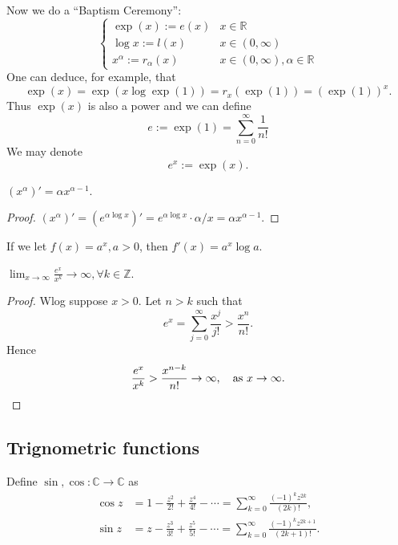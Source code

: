 Now we do a ``Baptism Ceremony'':
\[
    \begin{cases}
    \exp (x):=e(x) &x\in \mathbb{R} \\
    \log x :=l(x) &x\in (0,\infty )\\
    x^{\alpha}:= r_\alpha(x) & x\in (0,\infty ),\alpha\in \mathbb{R}
    \end{cases} 
\]
One can deduce, for example, that 
\[
    \exp (x)=\exp (x \log \exp (1) ) = r_x(\exp (1)) = (\exp (1))^x.
\]
Thus $\exp(x)$ is also a power and we can define 
\[
    \boxed{e:= \exp (1) = \sum_{n=0}^{\infty}\frac{1}{n!}}
\]
We may denote 
\[
    e^x:= \exp (x).
\]
\begin{sprop}
    $ (x^\alpha)'=\alpha x^{\alpha-1} $.
\end{sprop}
\begin{proof}
    $ (x^\alpha)'=(e^{\alpha \log x})'=e^{\alpha \log x}\cdot \alpha/x = \alpha x^{\alpha-1} $.
\end{proof}
\begin{note}
    If we let $ f(x)=a^x,a>0 $, then $ f'(x)=a^x\log a $.
\end{note}

\begin{sprop}
    $\displaystyle \lim_{x \to \infty} \frac{e^x}{x^k}\to \infty, \forall k\in \mathbb{Z}$. 
\end{sprop}
\begin{proof}
    Wlog suppose $x>0$. Let $n>k$ such that 
    \[
        e^x = \sum_{j=0}^{\infty} \frac{x^j}{j!}>\frac{x^n}{n!}.
    \]
    Hence 
    \[
        \frac{e^x}{x^k}>\frac{x^{n-k}}{n!}\to \infty,\quad \text{as }x\to \infty .\qedhere
    \]
\end{proof}

\subsection{Trignometric functions}
\begin{definition}
    Define $ \sin ,\cos : \mathbb{C} \to \mathbb{C} $ as 
    \begin{align*}
        \cos z &= 1-\frac{z^2}{2!}+\frac{z^4}{4!}-\cdots = \sum_{k=0}^{\infty} \frac{(-1)^k z^{2k}}{(2k)!},\\ 
        \sin z &= z-\frac{z^3}{3!}+\frac{z^5}{5!}-\cdots = \sum_{k=0}^{\infty}\frac{(-1)^k z^{2k+1}}{(2k+1)!}.
    \end{align*}
\end{definition}

